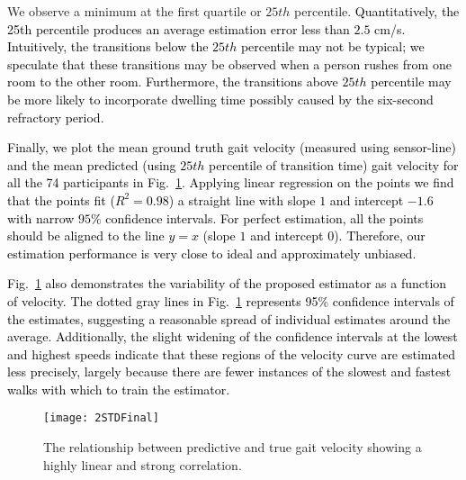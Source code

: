 \documentclass[journal]{IEEEtran}
\newcommand{\RR}[1]{\textcolor{black}{#1}}
\newcommand{\DA}[1]{\textcolor{black}{#1}}
\begin{document}
We observe a minimum at the first quartile or $25th$ percentile. \DA{Quantitatively, the 25th percentile produces an average estimation error less than \RR{$2.5$} cm/s}. \RR{Intuitively, the transitions below the $25th$ percentile may not be typical; we speculate that these transitions may be observed when a person rushes from one room to the other room. Furthermore, the transitions above $25th$ percentile may be more likely to incorporate dwelling time possibly caused by the six-second refractory period. 
}

\RR{Finally, we plot the mean ground truth gait velocity (measured using sensor-line) and the mean predicted (using $25th$ percentile of transition time) gait velocity for all the 74 participants in Fig.~\ref{fig:compareTwoMean}. Applying linear regression on the points we find that the points fit ($R^2=0.98$) a straight line with slope $1$ and intercept $-1.6$ with narrow $95\%$ confidence intervals. 
For perfect estimation, all the points should be aligned to the line $y=x$ (slope $1$ and intercept 0). Therefore, our estimation performance is very close to ideal and approximately unbiased.}

\DA{Fig.~\ref{fig:compareTwoMean} also demonstrates the variability of the proposed estimator as a function of velocity.  The dotted gray lines in Fig.~\ref{fig:compareTwoMean} represents 95\% confidence intervals of the estimates, suggesting a reasonable spread of individual estimates around the average.  Additionally, the slight widening of the confidence intervals at the lowest and highest speeds indicate that these regions of the velocity curve are estimated less precisely, largely because there are fewer instances of the slowest and fastest walks with which to train the estimator.}





\begin{figure}
\centering
\texttt{[image: 2STDFinal]}
\caption{The relationship between predictive and true gait velocity showing a highly linear
and strong correlation.}
\label{fig:compareTwoMean}
\end{figure}
\end{document}
